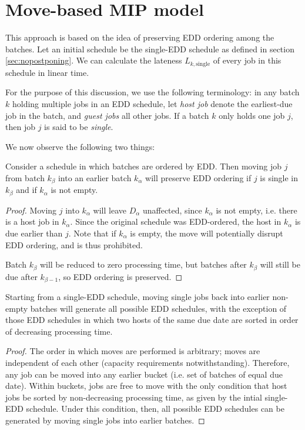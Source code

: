 \documentclass[13pt, letterpaper, oneside]{book}
\begin{document}
\section{Move-based MIP model}
\label{sec:movebackmip}
This approach is based on the idea of preserving EDD ordering among the batches.
Let an initial schedule be the single-EDD schedule as defined in section
\ref{sec:nopostponing}. We can calculate the lateness
$L_{k,\text{single}}$ of every job in this schedule in linear time.

For the purpose of this discussion, we use the following terminology: in any
batch $k$ holding multiple jobs in an EDD schedule, let \textit{host job} denote
the earliest-due job in the batch, and \textit{guest jobs} all other jobs. If a
batch $k$ only holds one job $j$, then job $j$ is said to be \textit{single}.
 
We now observe the following two things:
 
\begin{proposition}
Consider a schedule in which batches are ordered by EDD. Then moving job $j$
from batch $k_\beta$ into an earlier batch $k_\alpha$ will preserve EDD ordering
if $j$ is single in $k_\beta$ and if $k_\alpha$ is not empty.
\end{proposition}
\begin{proof}
Moving $j$ into $k_\alpha$ will leave $D_\alpha$ unaffected, since $k_\alpha$ is
not empty, i.e. there is a host job in $k_\alpha$. Since the original schedule
was EDD-ordered, the host in $k_\alpha$ is due earlier than $j$. Note that if
$k_\alpha$ is empty, the move will potentially disrupt EDD ordering, and is thus
prohibited.
 
Batch $k_\beta$ will be reduced to zero processing time, but batches after
$k_\beta$ will still be due after $k_{\beta - 1}$, so EDD ordering is preserved.
\end{proof}
 
\begin{proposition}
Starting from a single-EDD schedule, moving single jobs back into earlier
non-empty batches will generate all possible EDD schedules, with the exception
of those EDD schedules in which two hosts of the same due date are sorted in
order of decreasing processing time.
\end{proposition}
\begin{proof}
The order in which moves are performed is arbitrary; moves are independent of
each other (capacity requirements notwithstanding). Therefore, any job can be
moved into any earlier bucket (i.e. set of batches of equal due date). Within
buckets, jobs are free to move with the only condition that host jobs be sorted
by non-decreasing processing time, as given by the intial single-EDD schedule.
Under this condition, then, all possible EDD schedules can be generated by
moving single jobs into earlier batches. \end{proof}
\end{document}
